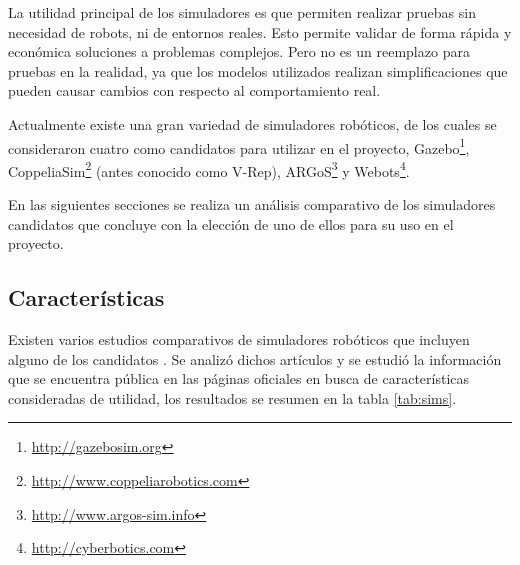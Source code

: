 La utilidad principal de los simuladores es que permiten realizar pruebas sin
necesidad de robots, ni de entornos reales. Esto permite validar de forma
rápida y económica soluciones a problemas complejos. Pero no es un reemplazo
para  pruebas en la realidad, ya que los modelos utilizados realizan
simplificaciones que pueden causar cambios con respecto al comportamiento
real.

Actualmente existe una gran variedad de simuladores robóticos, de los cuales se consideraron
cuatro como candidatos para utilizar en el proyecto, Gazebo\footnote{\url{http://gazebosim.org}},
CoppeliaSim\footnote{\url{http://www.coppeliarobotics.com}} (antes conocido como V-Rep), ARGoS\footnote{\url{http://www.argos-sim.info}}
y Webots\footnote{\url{http://cyberbotics.com}}.


En las siguientes secciones se realiza un análisis comparativo de los simuladores
candidatos que concluye con la elección de uno de ellos para su uso en el
proyecto.

\subsection{Características}

Existen varios estudios comparativos de simuladores robóticos que incluyen
alguno de los candidatos \cite{Nogueira2014, SantosPessoadeMelo2019,
ramli2015overview, Pitonakova2018}. 
Se analizó dichos artículos y se estudió la información que se encuentra pública
en las páginas oficiales en busca de características consideradas de utilidad, los resultados se resumen en la  
tabla \ref{tab:sims}. 

